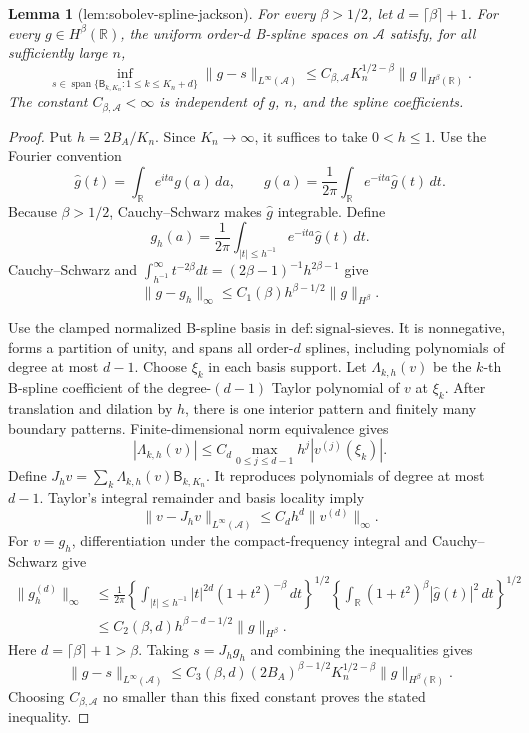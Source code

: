 \documentclass{article}
\newtheorem{lemma}{Lemma}
\begin{document}
\begin{lemma}[lem:sobolev-spline-jackson]\label{lem:sobolev-spline-jackson}
For every \(\beta>1/2\), let \(d=\lceil\beta\rceil+1\).  For every
\(g\in H^\beta(\mathbb R)\), the uniform order-\(d\) B-spline spaces on
\(\mathcal A\) satisfy, for all sufficiently large \(n\),
\[
 \inf_{s\in\operatorname{span}\{\mathsf B_{k,K_n}:1\le k\le K_n+d\}}
 \|g-s\|_{L^\infty(\mathcal A)}
 \le C_{\beta,\mathcal A}K_n^{1/2-\beta}
       \|g\|_{H^\beta(\mathbb R)}.
\]
The constant \(C_{\beta,\mathcal A}<\infty\) is independent of \(g\),
\(n\), and the spline coefficients.
\end{lemma}
\begin{proof}
Put \(h=2B_A/K_n\). Since \(K_n\to\infty\), it suffices to take \(0<h\le1\). Use the Fourier convention
\[
 \widehat g(t)=\int_{\mathbb R}e^{ita}g(a)\,da,
 \qquad g(a)=\frac1{2\pi}\int_{\mathbb R}e^{-ita}\widehat g(t)\,dt.
\]
Because \(\beta>1/2\), Cauchy--Schwarz makes \(\widehat g\) integrable. Define
\[
 g_h(a)=\frac1{2\pi}\int_{|t|\le h^{-1}}e^{-ita}\widehat g(t)\,dt.
\]
Cauchy--Schwarz and \(\int_{h^{-1}}^\infty t^{-2\beta}dt=(2\beta-1)^{-1}h^{2\beta-1}\) give
\[
 \|g-g_h\|_\infty\le C_1(\beta)h^{\beta-1/2}\|g\|_{H^\beta}.
\]

Use the clamped normalized B-spline basis in \(\mathrm{def{:}signal\text{-}sieves}\). It is nonnegative, forms a partition of unity, and spans all order-\(d\) splines, including polynomials of degree at most \(d-1\). Choose \(\xi_k\) in each basis support. Let \(\Lambda_{k,h}(v)\) be the \(k\)-th B-spline coefficient of the degree-\((d-1)\) Taylor polynomial of \(v\) at \(\xi_k\). After translation and dilation by \(h\), there is one interior pattern and finitely many boundary patterns. Finite-dimensional norm equivalence gives
\[
 |\Lambda_{k,h}(v)|\le C_d\max_{0\le j\le d-1}h^j|v^{(j)}(\xi_k)|.
\]
Define \(J_hv=\sum_k\Lambda_{k,h}(v)\mathsf B_{k,K_n}\). It reproduces polynomials of degree at most \(d-1\). Taylor's integral remainder and basis locality imply
\[
 \|v-J_hv\|_{L^\infty(\mathcal A)}\le C_dh^d\|v^{(d)}\|_\infty.
\]
For \(v=g_h\), differentiation under the compact-frequency integral and Cauchy--Schwarz give
\[
 \begin{aligned}
 \|g_h^{(d)}\|_\infty
 &\le\frac1{2\pi}
 \left\{\int_{|t|\le h^{-1}}|t|^{2d}(1+t^2)^{-\beta}\,dt\right\}^{1/2}
 \left\{\int_{\mathbb R}(1+t^2)^\beta|\widehat g(t)|^2\,dt\right\}^{1/2}\\
 &\le C_2(\beta,d)h^{\beta-d-1/2}\|g\|_{H^\beta}.
 \end{aligned}
\]
Here \(d=\lceil\beta\rceil+1>\beta\). Taking \(s=J_hg_h\) and combining the inequalities gives
\[
 \|g-s\|_{L^\infty(\mathcal A)}
 \le C_3(\beta,d)(2B_A)^{\beta-1/2}K_n^{1/2-\beta}\|g\|_{H^\beta(\mathbb R)}.
\]
Choosing \(C_{\beta,\mathcal A}\) no smaller than this fixed constant proves the stated inequality.
\end{proof}
\end{document}
